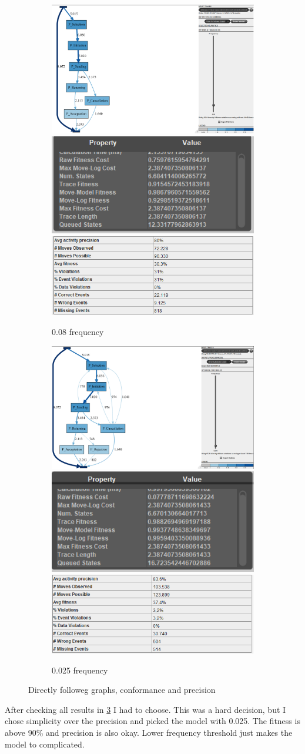 \begin{figure}[!htbp]
\centering
\begin{subfigure}{0.8\textwidth}
  \centering
  \includegraphics[width=0.3\linewidth]{P_DirectlyFollowedFreq0-08.PNG}
  \includegraphics[width=0.3\linewidth]{P_Conformance0-08.PNG}
  \includegraphics[width=0.3\linewidth]{P_Precision0-08.PNG}
  \caption{0.08 frequency}
  \label{fig:P_0-08}
\end{subfigure}
\begin{subfigure}{0.8\textwidth}
  \centering
  \includegraphics[width=0.3\linewidth]{P_DirectlyFollowedFreq0-025.PNG}
  \includegraphics[width=0.3\linewidth]{P_Conformance0-025.PNG}
  \includegraphics[width=0.3\linewidth]{P_Precision0-025.PNG}
  \caption{0.025 frequency}
  \label{fig:P_0-025}
\end{subfigure}
\caption{Directly followeg graphs, conformance and precision}
\label{fig:P_Direct2}
\end{figure}

After checking all results in \ref{fig:P_Direct2} I had to choose.
This was a hard decision, but I chose simplicity over the precision and picked the model with 0.025. The fitness is above 90\% and precision is also okay. Lower frequency threshold just makes the model to complicated.

